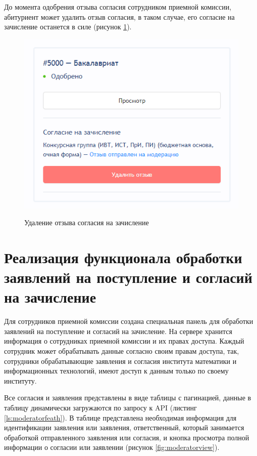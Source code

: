 До момента одобрения отзыва согласия сотрудником приемной комиссии, абитуриент может удалить отзыв согласия, в таком случае, его согласие на зачисление останется в силе (рисунок \ref{fig:agrecanseledelete}).

\begin{figure}[H]
\begin{center}
\includegraphics[width=0.7\hsize]{fig/agree-cansel-delete.png}\\[2mm]
\caption{Удаление отзыва согласия на зачисление}\label{fig:agrecanseledelete}
\end{center}
\end{figure}

\section{Реализация функционала обработки заявлений на поступление и согласий на зачисление}

Для сотрудников приемной комиссии создана специальная панель для обработки заявлений на поступление и согласий на зачисление. На сервере хранится информация о сотрудниках приемной комиссии и их правах доступа. Каждый сотрудник может обрабатывать данные согласно своим правам доступа, так, сотрудники обрабатывающие заявления и согласия института математики и информационных технологий, имеют доступ к данным только по своему институту.

Все согласия и заявления представлены в виде таблицы с пагинацией, данные в таблицу динамически загружаются по запросу к API (листинг \ref{ls:moderatorfeath}). В таблице представлена необходимая информация для идентификации заявления или заявления, ответственный, который занимается обработкой отправленного заявления или согласия, и кнопка просмотра полной информации о согласии или заявлении (рисунок \ref{fig:moderatorview}).

